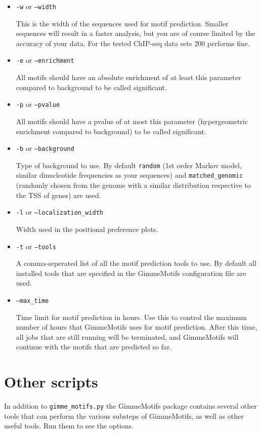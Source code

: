 \documentclass[11pt]{article}
\begin{document}
\begin{itemize}
\item 
\texttt{-w} or \texttt{--width}

This is the width of the sequences used for motif prediction. Smaller sequences will result in a faster analysis, but you are of course limited by the accuracy of your data. For the tested ChIP-seq data sets 200 performs fine.

\item 
\texttt{-e} or \texttt{--enrichment}

All motifs should have an absolute enrichment of at least this parameter compared to background to be called significant.

\item 
\texttt{-p} or \texttt{--pvalue}

All motifs should have a pvalue of at most this parameter (hypergeometric enrichment compared to background) to be called significant.

\item 
\texttt{-b} or \texttt{--background}

Type of background to use. By default \texttt{random} (1st order Markov model, similar dinucleotide frequencies as your sequences) and \texttt{matched\_genomic} (randomly chosen from the genome with a similar distribution respective to the TSS of genes) are used.

\item 
\texttt{-l} or \texttt{--localization\_width}

Width used in the positional preference plots.

\item 
\texttt{-t} or \texttt{--tools}

A comma-seperated list of all the motif prediction tools to use. By default all installed tools that are specified in the GimmeMotifs configuration file are used.

\item
\texttt{--max\_time}

 Time limit for motif prediction in hours. Use this to control the maximum number of hours that GimmeMotifs uses for motif prediction. After this time, all jobs that are still running will be terminated, and GimmeMotifs will continue with the motifs that are predicted so far.

\end{itemize}


\section{Other scripts}
In addition to \texttt{gimme\_motifs.py} the GimmeMotifs package contains several other tools that can perform the various substeps of GimmeMotifs, as well as other useful tools. Run them to see the options.
\end{document}
